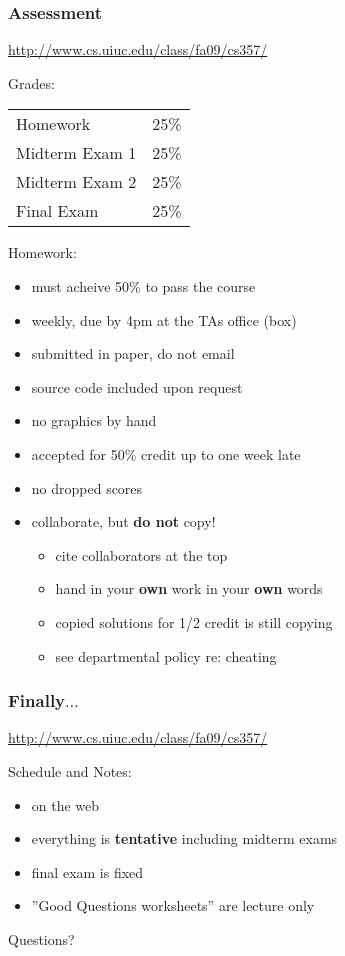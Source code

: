 \documentclass[10pt]{beamer}
\begin{document}
\begin{frame}
\frametitle{Assessment}
\begin{block}{}
\url{http://www.cs.uiuc.edu/class/fa09/cs357/}
\end{block}
Grades:
\begin{tabular}{l l}
Homework   & 25\%\\
Midterm Exam 1 & 25\%\\
Midterm Exam 2 & 25\%\\
Final Exam & 25\%\\
\end{tabular}

Homework: 
\begin{itemize}
\item must acheive 50\% to pass the course
\item weekly, due by 4pm at the TAs office (box)
\item submitted in paper, do not email
\item source code included upon request
\item no graphics by hand
\item accepted for 50\% credit up to one week late
\item no dropped scores
\item collaborate, but {\bf do not} copy!
\begin{itemize}
\item cite collaborators at the top
\item hand in your {\bf own} work in your {\bf own} words
\item copied solutions for 1/2 credit is still copying
\item see departmental policy re: cheating
\end{itemize}
\end{itemize}
\end{frame}
\begin{frame}
\frametitle{Finally$\ldots$}
\begin{block}{}
\url{http://www.cs.uiuc.edu/class/fa09/cs357/}
\end{block}
\vspace{1cm}
Schedule and Notes:
\begin{itemize}
\item on the web
\item everything is {\bf tentative} including midterm exams
\item final exam is fixed
\item ''Good Questions worksheets'' are lecture only
\end{itemize}
\vspace{1cm}
\begin{alertblock}{}
\centering
Questions?
\end{alertblock}
\end{frame}
\end{document}
